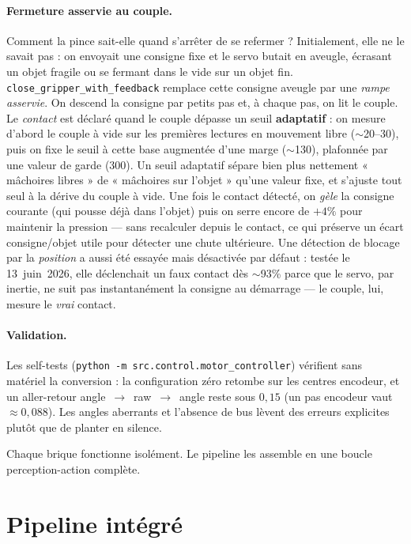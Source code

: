 \paragraph{Fermeture asservie au couple.} Comment la pince sait-elle quand
s'arrêter de se refermer ? Initialement, elle ne le savait pas : on envoyait une
consigne fixe et le servo butait en aveugle, écrasant un objet fragile ou se
fermant dans le vide sur un objet fin. \texttt{close\_gripper\_with\_feedback}
remplace cette consigne aveugle par une \emph{rampe asservie}. On descend la
consigne par petits pas et, à chaque pas, on lit le couple. Le \emph{contact} est
déclaré quand le couple dépasse un seuil \textbf{adaptatif} : on mesure d'abord le
couple à vide sur les premières lectures en mouvement libre ($\sim$20--30), puis
on fixe le seuil à cette base augmentée d'une marge ($\sim$130), plafonnée par une
valeur de garde ($300$). Un seuil adaptatif sépare bien plus nettement
« mâchoires libres » de « mâchoires sur l'objet » qu'une valeur fixe, et s'ajuste
tout seul à la dérive du couple à vide. Une fois le contact détecté, on \emph{gèle}
la consigne courante (qui pousse déjà dans l'objet) puis on serre encore de
$+4\%$ pour maintenir la pression — sans recalculer depuis le contact, ce qui
préserve un écart consigne/objet utile pour détecter une chute ultérieure. Une
détection de blocage par la \emph{position} a aussi été essayée mais désactivée
par défaut : testée le 13~juin~2026, elle déclenchait un faux contact dès $\sim$93\%
parce que le servo, par inertie, ne suit pas instantanément la consigne au
démarrage — le couple, lui, mesure le \emph{vrai} contact.

\paragraph{Validation.} Les self-tests (\texttt{python -m src.control.motor\_controller})
vérifient sans matériel la conversion : la configuration zéro retombe sur les
centres encodeur, et un aller-retour angle~$\to$~raw~$\to$~angle reste sous
$0{,}15$\textdegree{} (un pas encodeur vaut $\approx 0{,}088$\textdegree). Les
angles aberrants et l'absence de bus lèvent des erreurs explicites plutôt que de
planter en silence.

Chaque brique fonctionne isolément. Le pipeline les assemble en une boucle
perception-action complète.

\section{Pipeline intégré}
\label{sec:pipeline}

